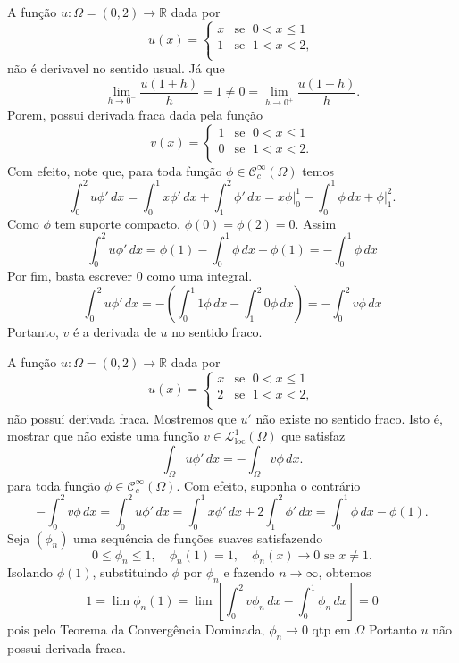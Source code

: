 \documentclass[a4paper, 11pt]{book}
\theoremstyle{definition}
\newcommand{\bR}{\mathbb{R}}
\newcommand{\cC}{\mathcal{C}}
\newcommand{\cL}{\mathcal{L}}
\newcommand{\loc}{\mathrm{loc}}
\begin{document}
\begin{ex} \label{ex:derivada-fraca-R}
    A função $u : \Omega  =(0,2) \to \bR$ dada por
    \[
        u(x) = \left\{
            \begin{array}{rl}
                x & \text{se }\; 0 < x \leqslant 1\\
                1 & \text{se }\; 1 < x < 2,\\
            \end{array}
        \right.
    \]
    não é derivavel no sentido usual. Já que
    \[
        \lim_{h\to0^-} \frac{u(1 + h)}{h} = 1 \neq 0 = \lim_{h\to0^+} \frac{u(1 + h)}{h}.
    \]
    Porem, possui derivada fraca dada pela função
    \[
        v(x) = \left\{
            \begin{array}{rl}
                1 & \text{se }\; 0 < x \leqslant 1\\
                0 & \text{se }\; 1 < x < 2.\\
            \end{array}
        \right.
    \]
    Com efeito, note que, para toda função $\phi \in \cC^\infty_c(\Omega)$ temos
    \[
        \int_0^2 u \phi' \,dx = \int_0^1 x \phi' \,dx + \int_1^2 \phi' \,dx = x \phi \bigg|_0^1 - \int_0^1 \phi \,dx + \phi \bigg|_1^2.
    \]
    Como $\phi$ tem suporte compacto, $\phi(0) = \phi(2) = 0$. Assim
    \[
        \int_0^2 u \phi' \,dx = \phi(1) - \int_0^1 \phi \,dx - \phi(1) = -\int_0^1 \phi \,dx
    \]
    Por fim, basta escrever $0$ como uma integral.
    \[
        \int_0^2 u \phi' \,dx = - \left(  \int_0^1 1\phi \, dx - \int_1^2 0\phi \,dx  \right) = -\int_0^2 v \phi \,dx
    \]
    Portanto, $v$ é a derivada de $u$ no sentido fraco.
\end{ex}

\begin{ex}
    A função $u : \Omega  = (0,2) \to \bR$ dada por
    \[
        u(x) = \left\{
            \begin{array}{rl}
                x & \text{se }\; 0 < x \leqslant 1\\
                2 & \text{se }\; 1 < x < 2,\\
            \end{array}
        \right.
    \]
    não possuí derivada fraca.
    Mostremos que $u'$ não existe no sentido fraco.
    Isto é, mostrar que não existe uma função $v \in \cL^1_\loc(\Omega)$ que satisfaz
    \[
        \int_\Omega u \phi' \, dx = -\int_\Omega v \phi \,dx.
    \]
    para toda função $\phi \in \cC_c^\infty(\Omega)$. 
    Com efeito, suponha o contrário
    \[
        -\int_0^2 v \phi \, dx = \int_0^2 u \phi' \,dx = \int_0^1 x \phi' \,dx + 2\int_1^2 \phi' \,dx = \int_0^1 \phi \,dx - \phi(1).
    \]
    Seja $(\phi_n)$ uma sequência de funções suaves satisfazendo
    \[
        0 \leqslant \phi_n \leqslant 1, \quad \phi_n(1) = 1, \quad \phi_n(x) \to 0 \text{ se } x \neq 1.
    \]
    Isolando $\phi(1)$, substituindo $\phi$ por $\phi_n$ e fazendo $n \to \infty$, obtemos
    \[
        1 = \lim \phi_n(1) = \lim \left[ \int_0^2 v \phi_n \, dx- \int_0^1 \phi_n \,dx \right] = 0
    \]
    pois pelo Teorema da Convergência Dominada, $\phi_n \to 0$ qtp em $\Omega$
    Portanto $u$ não possui derivada fraca.
\end{ex}
\end{document}
